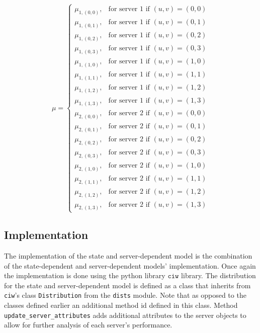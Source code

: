 \begin{equation}\label{eq:state_server_dependent_service_rate_example}
    \mu =
    \begin{cases}
        \mu_{1, (0,0)}, & \text{for server } 1 \text{ if } (u, v) = (0, 0) \\
        \mu_{1, (0,1)}, & \text{for server } 1 \text{ if } (u, v) = (0, 1) \\
        \mu_{1, (0,2)}, & \text{for server } 1 \text{ if } (u, v) = (0, 2) \\
        \mu_{1, (0,3)}, & \text{for server } 1 \text{ if } (u, v) = (0, 3) \\
        \mu_{1, (1,0)}, & \text{for server } 1 \text{ if } (u, v) = (1, 0) \\
        \mu_{1, (1,1)}, & \text{for server } 1 \text{ if } (u, v) = (1, 1) \\
        \mu_{1, (1,2)}, & \text{for server } 1 \text{ if } (u, v) = (1, 2) \\
        \mu_{1, (1,3)}, & \text{for server } 1 \text{ if } (u, v) = (1, 3) \\
        \mu_{2, (0,0)}, & \text{for server } 2 \text{ if } (u, v) = (0, 0) \\
        \mu_{2, (0,1)}, & \text{for server } 2 \text{ if } (u, v) = (0, 1) \\
        \mu_{2, (0,2)}, & \text{for server } 2 \text{ if } (u, v) = (0, 2) \\
        \mu_{2, (0,3)}, & \text{for server } 2 \text{ if } (u, v) = (0, 3) \\
        \mu_{2, (1,0)}, & \text{for server } 2 \text{ if } (u, v) = (1, 0) \\
        \mu_{2, (1,1)}, & \text{for server } 2 \text{ if } (u, v) = (1, 1) \\
        \mu_{2, (1,2)}, & \text{for server } 2 \text{ if } (u, v) = (1, 2) \\
        \mu_{2, (1,3)}, & \text{for server } 2 \text{ if } (u, v) = (1, 3)
    \end{cases}
\end{equation}


\subsection{Implementation}

The implementation of the state and server-dependent model is the
combination of the state-dependent and server-dependent models' implementation.
Once again the implementation is done using the python library \(\texttt{ciw}\)
library.
The distribution for the state and server-dependent model is defined as a
class that inherits from \texttt{ciw}'s class \texttt{Distribution} from
the \texttt{dists} module.
Note that as opposed to the classes defined earlier an additional method id
defined in this class.
Method \texttt{update\_server\_attributes} adds additional attributes to the
server objects to allow for further analysis of each server's performance.

